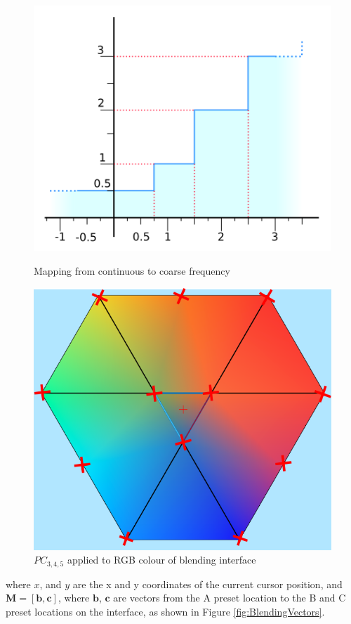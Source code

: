 \documentclass[11pt, oneside]{report}   	%
\renewcommand{\vec}[1]{\mathbf{#1}}
\begin{document}
\begin{figure}
	\includegraphics[width = \textwidth/3]{FreqCoarse.png}
	\caption{Mapping from continuous to coarse frequency}
	\label{fig:Freq Coarse}
	\includegraphics[width = \textwidth/3]{BlendingColours2.png}
	\caption{$PC_{3,4,5}$ applied to RGB colour of blending interface}
	\label{fig:BlendingColours}
	\vspace{-60pt}
\end{figure}
where $x$, and $y$ are the x and y coordinates of the current cursor position, and $\vec{M} =[\vec{b},  \vec{c}]$, where $\vec{b}$,  $\vec{c}$ are vectors from the A preset location to the B and C preset locations on the interface, as shown in Figure \ref{fig:BlendingVectors}.
\end{document}
